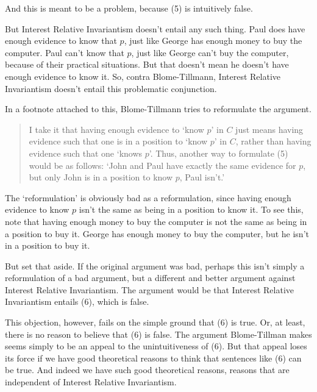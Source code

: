 \noindent And this is meant to be a problem, because (5) is intuitively false.

But Interest Relative Invariantism doesn't entail any such thing. Paul does have enough evidence to know that \(p\), just like George has enough money to buy the computer. Paul can't know that \(p\), just like George can't buy the computer, because of their practical situations. But that doesn't mean he doesn't have enough evidence to know it. So, contra Blome-Tillmann, Interest Relative Invariantism doesn't entail this problematic conjunction.

In a footnote attached to this, Blome-Tillmann tries to reformulate the argument.

\begin{quote}
\noindent I take it that having enough evidence to `know \(p\)' in \(C\) just means having evidence such that one is in a position to `know \(p\)' in \(C\), rather than having evidence such that one `knows \(p\)'. Thus, another way to formulate (5) would be as follows: `John and Paul have exactly the same evidence for \(p\), but only John is in a position to know \(p\), Paul isn't.' \cite[??]{MBT2009}
\end{quote}

\noindent The `reformulation' is obviously bad as a reformulation, since having enough evidence to know \(p\) isn't the same as being in a position to know it. To see this, note that  having enough money to buy the computer is not the same as being in a position to buy it. George has enough money to buy the computer, but he isn't in a position to buy it.

But set that aside. If the original argument was bad, perhaps this isn't simply a reformulation of a bad argument, but a different and better argument against Interest Relative Invariantism. The argument would be that Interest Relative Invariantism entails (6), which is false.


\noindent This objection, however, fails on the simple ground that (6) is true. Or, at least, there is no reason to believe that (6) is false. The argument Blome-Tillman makes seems simply to be an appeal to the unintuitiveness of (6). But that appeal loses its force if we have good theoretical reasons to think that sentences like (6) can be true. And indeed we have such good theoretical reasons, reasons that are independent of Interest Relative Invariantism.

